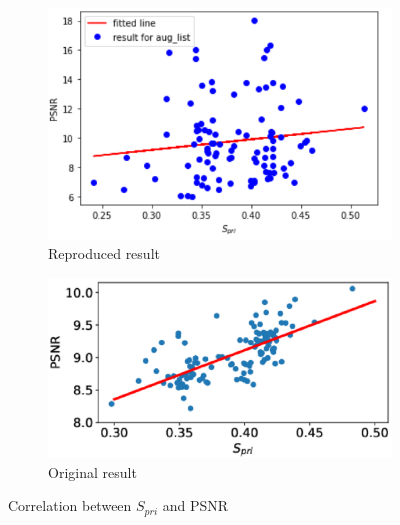 \begin{figure}[h]
        \centering
        \begin{subfigure}{0.4\textwidth}
            \includegraphics[width=1.\textwidth]{images/fig2.png}
             \caption{Reproduced result}
            \label{fig:2re}
        \end{subfigure}
        \begin{subfigure}{0.4\textwidth}
            \includegraphics[width=1.\textwidth]{images/fig2og.png}
             \caption{Original result}
            \label{fig:2og}
        \end{subfigure}
        \caption{Correlation between $S_{pri}$ and PSNR}
        \label{fig:2}
    \vspace{-5mm}
\end{figure}


